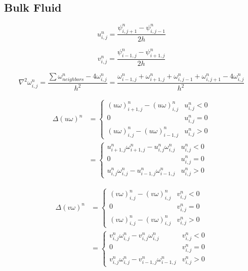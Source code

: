 \subsection{Bulk Fluid}
\begin{equation}
    u_{i, j}^{n} = \frac{\psi_{i, j + 1}^{n} - \psi_{i, j - 1}^{n}}{2h}
\end{equation}

\begin{equation}
    v_{i, j}^{n} = \frac{\psi_{i - 1, j}^{n} - \psi_{i + 1, j}^{n}}{2h}
\end{equation}

\begin{equation}
    \nabla^2\omega_{i, j}^{n} = \frac{\sum \omega_{neighbors}^{n} - 4 \omega_{i, j}^{n}}{h^2} = \frac{\omega_{i - 1, j}^{n} + \omega_{i + 1, j}^{n} + \omega_{i, j - 1}^{n} + \omega_{i, j + 1}^{n} - 4 \omega_{i, j}^{n}}{h^2}
\end{equation}


\begin{equation}
    \begin{split}
    \Delta (u \omega)^n  & = \begin{cases} 
          (u\omega)_{i + 1, j}^{n} - (u\omega)_{i, j}^{n} & u_{i, j}^n < 0 \\
          0 & u_{i, j}^n = 0 \\
          (u\omega)_{i, j}^{n} - (u\omega)_{i - 1, j}^{n} & u_{i, j}^n > 0 
       \end{cases} \\
        & = \begin{cases} 
              u_{i + 1, j}^{n}\omega_{i + 1, j}^{n} - u_{i, j}^{n}\omega_{i, j}^{n} & u_{i, j}^n < 0 \\
              0 & u_{i, j}^n = 0 \\
              u_{i, j}^{n}\omega_{i, j}^{n} - u_{i - 1, j}^{n}\omega_{i - 1, j}^{n} & u_{i, j}^n > 0 
           \end{cases}
    \end{split}
\end{equation}



\begin{equation}
    \begin{split}
    \Delta (v \omega)^n  & = \begin{cases} 
          (v\omega)_{i, j}^{n} - (v\omega)_{i, j}^{n} & v_{i, j}^n < 0 \\
          0 & v_{i, j}^n = 0 \\
          (v\omega)_{i, j}^{n} - (v\omega)_{i, j}^{n} & v_{i, j}^n > 0 
       \end{cases} \\
        & = \begin{cases} 
              v_{i, j}^{n}\omega_{i, j}^{n} - v_{i, j}^{n}\omega_{i, j}^{n} & v_{i, j}^n < 0 \\
              0 & v_{i, j}^n = 0 \\
              v_{i, j}^{n}\omega_{i, j}^{n} - v_{i - 1, j}^{n}\omega_{i - 1, j}^{n} & v_{i, j}^n > 0 
           \end{cases}
    \end{split}
\end{equation}


